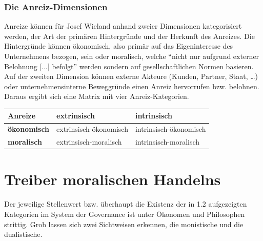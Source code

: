 \documentclass[12pt]{article}
\begin{document}
\section{Die Anreiz-Dimensionen}
Anreize können für Josef Wieland anhand zweier Dimensionen kategorisiert werden, der Art der primären Hintergründe und der Herkunft des Anreizes. Die Hintergründe können ökonomisch, also primär auf das Eigeninteresse des Unternehmens bezogen, sein oder moralisch, welche “nicht nur aufgrund externer Belohnung [...] befolgt” werden sondern auf gesellschaftlichen Normen basieren. Auf der zweiten Dimension können externe Akteure (Kunden, Partner, Staat, …) oder unternehmensinterne Beweggründe einen Anreiz hervorrufen bzw. belohnen. Daraus ergibt sich eine Matrix mit vier Anreiz-Kategorien.
\begin{center}
\begin{tabular}{|p{3cm}|p{5cm}|p{5cm}|}
\hline
Anreize & \textbf{extrinsisch} & \textbf{intrinsisch}\\\hline
\textbf{ökonomisch} & extrinsisch-ökonomisch & intrinsisch-ökonomisch\\\hline
\textbf{moralisch} & extrinsisch-moralisch & intrinsisch-moralisch\\\hline
\end{tabular}
\end{center}
\part{Treiber moralischen Handelns}
Der jeweilige Stellenwert bzw. überhaupt die Existenz der in 1.2 aufgezeigten Kategorien im System der Governance ist unter Ökonomen und Philosophen strittig. Grob lassen sich zwei Sichtweisen erkennen, die monistische und die dualistische.
\end{document}
